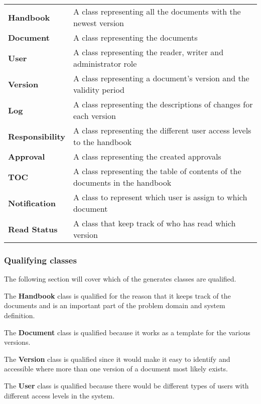 \begin{tabular}{l l}

  \textbf{Handbook} & A class representing all the documents with the newest version\\
  \textbf{Document} & A class representing the documents\\ %
  \textbf{User }& A class representing the reader, writer and administrator role\\
 \textbf{Version} & A class representing a document’s version and the validity period\\
  \textbf{Log} & A class representing the descriptions of changes for each version\\
  \textbf{Responsibility} & A class representing the different user access levels to the handbook\\
 \textbf{Approval} & A class representing the created approvals\\  %
  \textbf{TOC} & A class representing the table of contents of the documents in the handbook\\
  \textbf{Notification} & A class to represent which user is assign to which document\\
  \textbf{Read Status} & A class that keep track of who has read which version

\end{tabular}


\subsubsection{Qualifying classes}
The following section will cover which of the generates classes are qualified.


The \textbf{Handbook} class is qualified for the reason that it keeps track of the documents and is an important part of the problem domain and system definition. 

The\textbf{ Document} class is qualified because it works as a template for the various versions. 

The \textbf{Version} class is qualified since it would make it easy to identify and accessible where more than one version of a document most likely exists.

The \textbf{User} class is qualified because there would be different types of users with different access levels in the system. 


